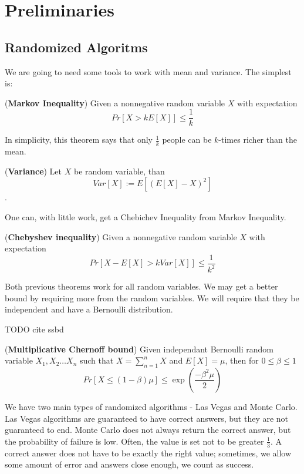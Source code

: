 \chapter{Preliminaries}
\section{Randomized Algoritms}
We are going to need some tools to work with mean and variance. The simplest is:
\begin{thm}
    (\textbf{Markov Inequality}) Given a nonnegative random variable $X$ with expectation $$ Pr[X > kE[X]]\leq \frac{1}{k}$$
\end{thm}
In simplicity, this theorem says that only $\frac{1}{k}$ people can be $k$-times richer than the mean.  

\begin{defn}
    (\textbf{Variance}) Let $X$ be random variable, than $$Var[X] := E[(E[X] - X)^2]$$.   
\end{defn}


One can, with little work, get a Chebichev Inequality from Markov Inequality.
\begin{thm}
    (\textbf{Chebyshev inequality})  Given a nonnegative random variable $X$ with expectation $$Pr[X-E[X] > kVar[X]] \leq \frac{1}{k^2}$$
\end{thm}

Both previous theorems work for all random variables. We may get a better bound by requiring more from the random variables. We will require that they be independent and have a Bernoulli distribution.

TODO cite ssbd

\begin{thm}
    (\textbf{Multiplicative Chernoff bound})  Given independant Bernoulli random variable $X_1, X_2 \dots X_n$ such that $X = \sum_{n=1}^nX$ and $E[X] = \mu$, then for $0 \leq \beta \leq 1$ 
    $$Pr[X \leq (1 - \beta)\mu] \leq \exp \left( \frac{-\beta^2\mu}{2} \right)$$
\end{thm}

We have two main types of randomized algorithms - Las Vegas and Monte Carlo.
Las Vegas algorithms are guaranteed to have correct answers, but they are not guaranteed to end.
Monte Carlo does not always return the correct answer, but the probability of failure is low. Often, the value is set not to be greater $\frac{1}{3}$. A correct answer does not 
have to be exactly the right value; sometimes, we allow some amount of error and answers close enough, we count as success.

